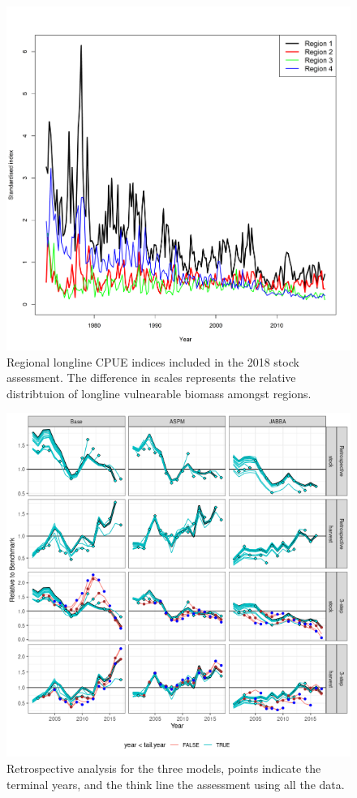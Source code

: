 \documentclass[12pt,halfline,a4paper,nonumbib]{ouparticle}
\begin{document}
\begin{figure}[!ht]
\centering
\includegraphics[width=6in]{figures/ll.png}
\caption{Regional longline CPUE indices included in the 2018 stock assessment. The difference in scales represents the relative distribtuion of longline vulnearable biomass amongst regions.}
\label{fig:ll}
\end{figure}

\begin{figure}[htbp]
\centering
\includegraphics[width=6in]{figures/final-retro-all-1.png}
\caption{Retrospective analysis for the three models, points indicate the terminal years, and the think line the assessment using all the data.}
\label{fig:retro}
\end{figure}
\end{document}
